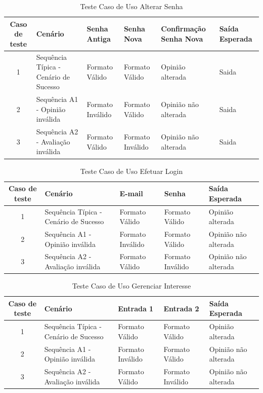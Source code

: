 \documentclass[a4paper,11pt]{article}
\begin{document}
	\begin{center}
	\begin{table}[H]
		\begin{tabularx}{\textwidth}{|c|X|X|X|X|X|} \hline
			\textbf{Caso de teste} & \textbf{Cenário} & \textbf{Senha Antiga} & \textbf{Senha Nova} & \textbf{Confirmação Senha Nova} & \textbf{Saída Esperada} \\ \hline
			1 & Sequência Típica - Cenário de Sucesso & Formato Válido & Formato Válido & Opinião alterada & Saida \\ \hline
			2 & Sequência A1 - Opinião inválida & Formato Inválido & Formato Válido & Opinião não alterada & Saida \\ \hline
			3 & Sequência A2 - Avaliação inválida & Formato Válido & Formato Inválido & Opinião não alterada & Saida \\ \hline
			
		\end{tabularx}
		\caption{Teste Caso de Uso Alterar Senha}
	\end{table}
	\end{center}
	
	\begin{center}
	\begin{table}[H]
		\begin{tabularx}{\textwidth}{|c|X|X|X|X|} \hline
			\textbf{Caso de teste} & \textbf{Cenário} & \textbf{E-mail} & \textbf{Senha} & \textbf{Saída Esperada} \\
			\hline
			1 & Sequência Típica - Cenário de Sucesso & Formato Válido & Formato Válido & Opinião alterada\\ \hline
			2 & Sequência A1 - Opinião inválida & Formato Inválido & Formato Válido & Opinião não alterada\\ \hline
			3 & Sequência A2 - Avaliação inválida & Formato Válido & Formato Inválido & Opinião não alterada\\ \hline
			
		\end{tabularx}
		\caption{Teste Caso de Uso Efetuar Login}
	\end{table}
	\end{center}
	
	\begin{center}
	\begin{table}[H]
		\begin{tabularx}{\textwidth}{|c|X|X|X|X|} \hline
			\textbf{Caso de teste} & \textbf{Cenário} & \textbf{Entrada 1} & \textbf{Entrada 2} & \textbf{Saída Esperada} \\
			\hline
			1 & Sequência Típica - Cenário de Sucesso & Formato Válido & Formato Válido & Opinião alterada\\ \hline
			2 & Sequência A1 - Opinião inválida & Formato Inválido & Formato Válido & Opinião não alterada\\ \hline
			3 & Sequência A2 - Avaliação inválida & Formato Válido & Formato Inválido & Opinião não alterada\\ \hline
			
		\end{tabularx}
		\caption{Teste Caso de Uso Gerenciar Interesse}
	\end{table}
	\end{center}
	
\end{document}
